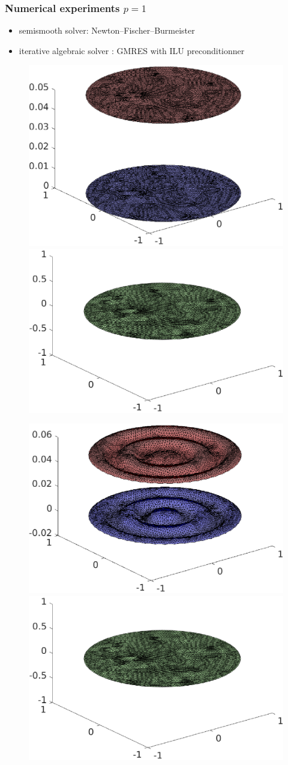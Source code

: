 %

\begin{frame}
\frametitle{Numerical experiments $p=1$}
\begin{itemize}
\item semismooth solver: Newton--Fischer--Burmeister
\item iterative algebraic solver : GMRES with ILU preconditionner
\end{itemize}
\begin{overprint}
\begin{figure}
\includegraphics[width=0.48 \textwidth]{fig_article_chap_2/test_case_128/fig_u1u2_hmax0,09_Dt0,001_tt00.eps} 
\quad
\includegraphics[width=0.48 \textwidth]{fig_article_chap_2/test_case_128/fig_lambda_hmax0,09_Dt0,001_tt02.eps} 
\end{figure}
\begin{figure}
\includegraphics[width=0.48 \textwidth]{fig_article_chap_2/test_case_128/fig_u1u2_hmax0,09_Dt0,001_tt01.eps} 
\quad
\includegraphics[width=0.48 \textwidth]{fig_article_chap_2/test_case_128/fig_lambda_hmax0,09_Dt0,001_tt02.eps} 

\end{figure}
\end{overprint}
\end{frame}
